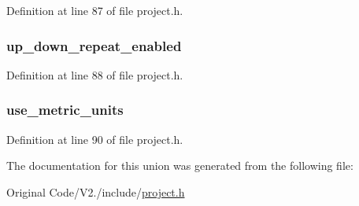 \-Definition at line 87 of file project.\-h.

\hypertarget{unions__system__flags_a47613fdc4c935cabe322cb63cac9150d}{
\subsubsection[{up\-\_\-down\-\_\-repeat\-\_\-enabled}]{ {\bf up\-\_\-down\-\_\-repeat\-\_\-enabled}}}\label{unions__system__flags_a47613fdc4c935cabe322cb63cac9150d}


\-Definition at line 88 of file project.\-h.

\hypertarget{unions__system__flags_a98d55100d4348e9980fe36505551b5d8}{
\subsubsection[{use\-\_\-metric\-\_\-units}]{ {\bf use\-\_\-metric\-\_\-units}}}\label{unions__system__flags_a98d55100d4348e9980fe36505551b5d8}


\-Definition at line 90 of file project.\-h.



\-The documentation for this union was generated from the following file\-:\begin{DoxyCompactItemize}
\item 
\-Original Code/\-V2./include/\hyperlink{project_8h}{project.\-h}\end{DoxyCompactItemize}
